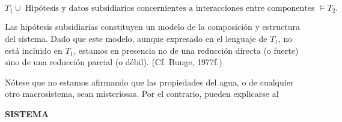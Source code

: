 {\[T_1 \cup \text{ Hipótesis y datos subsidiarios concernientes a interacciones entre componentes } \models T_2.\]

Las hipótesis subsidiarias constituyen un modelo de la composición y estructura del sistema. Dado que este modelo, aunque expresado en el lenguaje de \( T_1 \), no está incluido en \( T_1 \), 
estamos en presencia no de una reducción directa (o fuerte) sino de una reducción parcial (o débil). (Cf. Bunge, 1977f.)

Nótese que no estamos afirmando que las propiedades del agua, o de cualquier otro macrosistema, sean misteriosas. Por el contrario, pueden explicarse al
}

\newpage
\fancyhf{}
\fancyhead[r]{\thepage}
\begin{center}
{\fontsize{13}{16}\selectfont \textbf{SISTEMA}}
\end{center}
\vspace{0.5cm}


